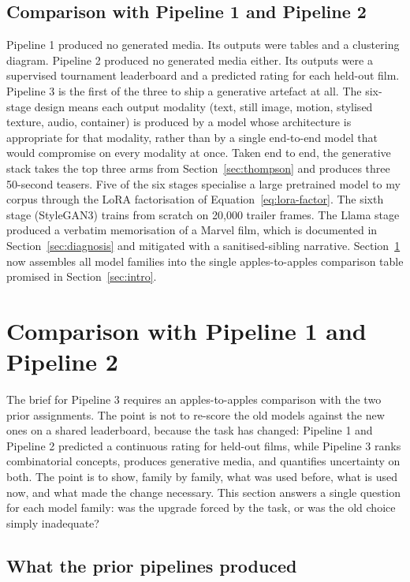 \documentclass{article}
\begin{document}
\subsection{Comparison with Pipeline 1 and Pipeline 2}

Pipeline 1 produced no generated media. Its outputs were tables and a clustering diagram. Pipeline 2 produced no generated media either. Its outputs were a supervised tournament leaderboard and a predicted rating for each held-out film. Pipeline 3 is the first of the three to ship a generative artefact at all. The six-stage design means each output modality (text, still image, motion, stylised texture, audio, container) is produced by a model whose architecture is appropriate for that modality, rather than by a single end-to-end model that would compromise on every modality at once. Taken end to end, the generative stack takes the top three arms from Section~\ref{sec:thompson} and produces three 50-second teasers. Five of the six stages specialise a large pretrained model to my corpus through the LoRA factorisation of Equation~\ref{eq:lora-factor}. The sixth stage (StyleGAN3) trains from scratch on 20{,}000 trailer frames. The Llama stage produced a verbatim memorisation of a Marvel film, which is documented in Section~\ref{sec:diagnosis} and mitigated with a sanitised-sibling narrative. Section~\ref{sec:compare} now assembles all model families into the single apples-to-apples comparison table promised in Section~\ref{sec:intro}.


\section{Comparison with Pipeline 1 and Pipeline 2}
\label{sec:compare}

The brief for Pipeline 3 requires an apples-to-apples comparison with the two prior assignments. The point is not to re-score the old models against the new ones on a shared leaderboard, because the task has changed: Pipeline 1 and Pipeline 2 predicted a continuous rating for held-out films, while Pipeline 3 ranks combinatorial concepts, produces generative media, and quantifies uncertainty on both. The point is to show, family by family, what was used before, what is used now, and what made the change necessary. This section answers a single question for each model family: was the upgrade forced by the task, or was the old choice simply inadequate?

\subsection{What the prior pipelines produced}
\end{document}
